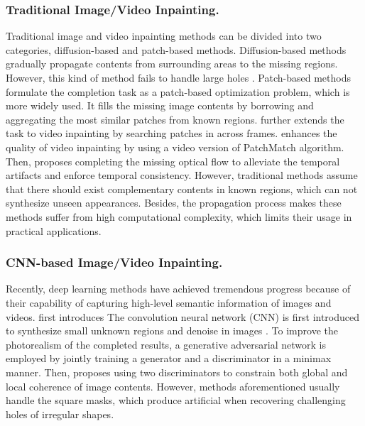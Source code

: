 \subsubsection{Traditional Image/Video Inpainting.}
Traditional image and video inpainting methods can be divided into two categories, diffusion-based and patch-based methods. 
Diffusion-based methods \cite{bertalmio2000image,ballester2001filling} gradually propagate contents from surrounding areas to the missing regions. 
However, this kind of method fails to handle large holes . 
Patch-based methods~\cite{bertalmio2003simultaneous,efros2001image} formulate the completion task as a patch-based optimization problem, which is more widely used. 
It fills the missing image contents by borrowing and aggregating the most similar patches from known regions. 
\cite{patwardhan2007video} further extends the task to video inpainting by searching patches in across frames. \cite{newson2014video} enhances the quality of video inpainting by using a video version of PatchMatch algorithm. 
Then, \cite{huang2016temporally} proposes completing the missing optical flow to alleviate the temporal artifacts and enforce temporal consistency. 
However, traditional methods assume that there should exist complementary contents in known regions, which can not synthesize unseen appearances. Besides, the propagation process makes these methods suffer from high computational complexity, which limits their usage in practical applications. 

\subsubsection{CNN-based Image/Video Inpainting.}
Recently, deep learning methods  have achieved tremendous progress because of their capability of capturing high-level semantic information of images and videos. 
 first introduces 
The convolution neural network (CNN) is first introduced to synthesize small unknown regions and denoise in images \cite{xie2012image}. 
To improve the photorealism of the completed results, a generative adversarial network is employed \cite{pathak2016context} by jointly training a generator and a discriminator in a minimax manner. 
Then, \cite{iizuka2017globally} proposes using two discriminators to constrain both global and local coherence of image contents. 
However, methods aforementioned usually handle the square masks, which produce artificial when recovering challenging holes of irregular shapes.
%

